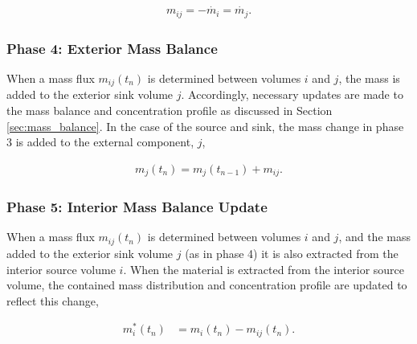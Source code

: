 \begin{align}
m_{ij}= -\dot{m_i} = \dot{m_j}.
\end{align}

\subsubsection{Phase 4: Exterior Mass Balance}

When a mass flux $m_{ij}(t_n)$ is determined between volumes $i$ and $j$, the 
mass is added to the exterior sink volume $j$. Accordingly, necessary updates 
are made to the mass balance and concentration profile as discussed in Section 
\ref{sec:mass_balance}. In the case of the source and sink, the mass change in 
phase 3 is added to the external component, $j$,

\begin{align}
 m_j(t_n) = m_j(t_{n-1}) + m_{ij}.
\end{align}

\subsubsection{Phase 5: Interior Mass Balance Update}

When a mass flux $m_{ij}(t_n)$ is determined between volumes $i$ and $j$, and 
the mass added to the exterior sink volume $j$ (as in phase 4) it is also 
extracted from the interior source volume $i$.  When the material is extracted 
from the interior source volume, the contained mass distribution and 
concentration profile are updated to reflect this change,

\begin{align}
  m_{i}^*(t_n) &= m_i(t_n) - m_{ij}(t_n).
\end{align}

